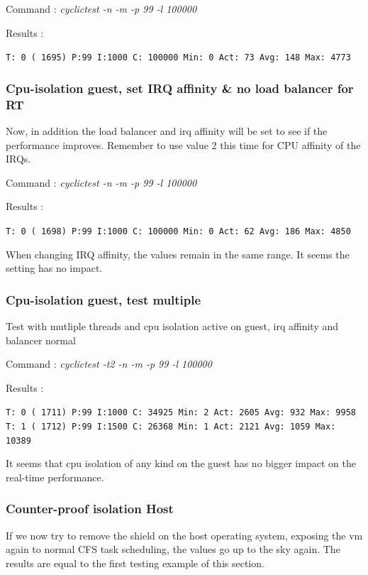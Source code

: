\documentclass[]{scrartcl}
\begin{document}
\bigskip

\noindent Command : \textit{cyclictest -n -m -p 99 -l 100000}

\noindent Results :

\noindent \texttt{T: 0 ( 1695) P:99 I:1000 C: 100000 Min:      0 Act:   73 Avg:  148 Max:    4773}

\subsubsection{Cpu-isolation guest, set IRQ affinity \& no load balancer for RT}

Now, in addition the load balancer and irq affinity will be set to see if the performance improves. Remember to use value 2 this time for CPU affinity of the IRQs.

\noindent Command : \textit{cyclictest -n -m -p 99 -l 100000}

\noindent Results :

\noindent \texttt{T: 0 ( 1698) P:99 I:1000 C: 100000 Min:      0 Act:   62 Avg:  186 Max:    4850}

When changing IRQ affinity, the values remain in the same range. It seems the setting has no impact.

\subsubsection{Cpu-isolation guest, test multiple}

Test with mutliple threads and cpu isolation active on guest, irq affinity and balancer normal

\noindent Command : \textit{cyclictest -t2 -n -m -p 99 -l 100000}

\noindent Results :

\noindent  
\texttt{T: 0 ( 1711) P:99 I:1000 C:  34925 Min:      2 Act: 2605 Avg:  932 Max:    9958}
\noindent
\texttt{T: 1 ( 1712) P:99 I:1500 C:  26368 Min:      1 Act: 2121 Avg: 1059 Max:   10389}

It seems that cpu isolation of any kind on the guest has no bigger impact on the real-time performance.

\subsubsection{Counter-proof isolation Host}

If we now try to remove the shield on the host operating system, exposing the vm again to normal CFS task scheduling, the values go up to the sky again. The results are equal to the first testing example of this section.
\end{document}

